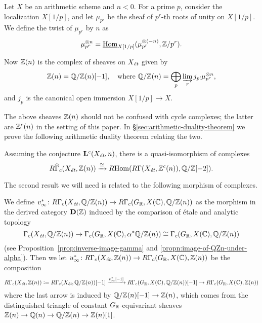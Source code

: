 \documentclass{article}
\numberwithin{equation}{section}
\begin{document}
\begin{definition}
  \label{dfn:sheaf-Z(n)}
  Let $X$ be an arithmetic scheme and $n < 0$. For a prime $p$, consider
  the localization $X [1/p]$, and let $\mu_{p^r}$ be the sheaf of $p^r$-th
  roots of unity on $X [1/p]$. We define the twist of $\mu_{p^r}$ by $n$
  as
  $$\mu_{p^r}^{\otimes n} = \iHom_{X[1/p]} (\mu_{p^r}^{\otimes (-n)}, \ZZ/p^r).$$

  Now $\ZZ (n)$ is the complex of sheaves on $X_\et$ given by
  \[ \ZZ (n) = \QQ/\ZZ (n) [-1],
  \quad \text{where }
  \QQ/\ZZ (n) = \bigoplus_p \varinjlim_r j_{p!} \mu_{p^r}^{\otimes n}, \]
  and $j_p$ is the canonical open immersion $X[1/p] \to X$.
\end{definition}

The above sheaves $\ZZ (n)$ should not be confused with cycle complexes;
the latter are $\ZZ^c (n)$ in the setting of this paper.
In \S\ref{sec:arithmetic-duality-theorem} we prove the following arithmetic
duality theorem relating the two.

\begin{maintheorem}
  \label{theorem-I}
  Assuming the conjecture $\mathbf{L}^c (X_\et,n)$, there is a quasi-isomorphism
  of complexes
  \[ R\widehat{\Gamma}_c (X_\et, \ZZ (n)) \xrightarrow{\cong}
  \RHom (R\Gamma (X_\et, \ZZ^c (n)), \QQ/\ZZ [-2]). \]
\end{maintheorem}

The second result we will need is related to the following morphism of
complexes.

\begin{definition}
  \label{dfn:u-infty}
  We define
  $v_\infty^*\colon R\Gamma_c (X_\et, \QQ/\ZZ (n)) \to R\Gamma_c (G_\RR, X (\CC), \QQ/\ZZ (n))$
  as the morphism in the derived category $\mathbf{D} (\ZZ)$ induced by the
  comparison of étale and analytic topology
  \[ \Gamma_c (X_\et, \QQ/\ZZ (n)) \to
  \Gamma_c (G_\RR, X (\CC), \alpha^* \QQ/\ZZ (n)) \cong
  \Gamma_c (G_\RR, X (\CC), \QQ/\ZZ (n)) \]
  (see Proposition~\ref{prop:inverse-image-gamma} and
  \ref{propn:image-of-QZn-under-alpha}). Then we let
  $u_\infty^*\colon R\Gamma_c (X_\et, \ZZ(n)) \to R\Gamma_c (G_\RR, X (\CC), \ZZ (n))$
  be the composition
  \[ R\Gamma_c (X_\et, \ZZ(n)) \dfn R\Gamma_c (X_\et, \QQ/\ZZ (n)) [-1]
  \xrightarrow{v_\infty^* [-1]} R\Gamma_c (G_\RR, X (\CC), \QQ/\ZZ (n)) [-1] \to
  R\Gamma_c (G_\RR, X (\CC), \ZZ (n)) \]
  where the last arrow is induced by $\QQ/\ZZ (n) [-1] \to \ZZ (n)$, which comes
  from the distinguished triangle of constant $G_\RR$-equivariant sheaves
  $\ZZ (n) \to \QQ (n) \to \QQ/\ZZ (n) \to \ZZ (n) [1]$.
\end{definition}
\end{document}
